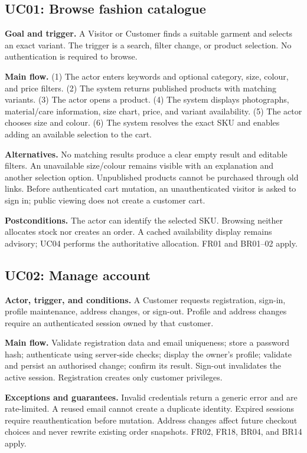 \subsection{UC01: Browse fashion catalogue}
\textbf{Goal and trigger.} A Visitor or Customer finds a suitable garment and selects an exact variant. The trigger is a search, filter change, or product selection. No authentication is required to browse.

\textbf{Main flow.} (1) The actor enters keywords and optional category, size, colour, and price filters. (2) The system returns published products with matching variants. (3) The actor opens a product. (4) The system displays photographs, material/care information, size chart, price, and variant availability. (5) The actor chooses size and colour. (6) The system resolves the exact SKU and enables adding an available selection to the cart.

\textbf{Alternatives.} No matching results produce a clear empty result and editable filters. An unavailable size/colour remains visible with an explanation and another selection option. Unpublished products cannot be purchased through old links. Before authenticated cart mutation, an unauthenticated visitor is asked to sign in; public viewing does not create a customer cart.

\textbf{Postconditions.} The actor can identify the selected SKU. Browsing neither allocates stock nor creates an order. A cached availability display remains advisory; UC04 performs the authoritative allocation. FR01 and BR01--02 apply.

\subsection{UC02: Manage account}
\textbf{Actor, trigger, and conditions.} A Customer requests registration, sign-in, profile maintenance, address changes, or sign-out. Profile and address changes require an authenticated session owned by that customer.

\textbf{Main flow.} Validate registration data and email uniqueness; store a password hash; authenticate using server-side checks; display the owner's profile; validate and persist an authorised change; confirm its result. Sign-out invalidates the active session. Registration creates only customer privileges.

\textbf{Exceptions and guarantees.} Invalid credentials return a generic error and are rate-limited. A reused email cannot create a duplicate identity. Expired sessions require reauthentication before mutation. Address changes affect future checkout choices and never rewrite existing order snapshots. FR02, FR18, BR04, and BR14 apply.

